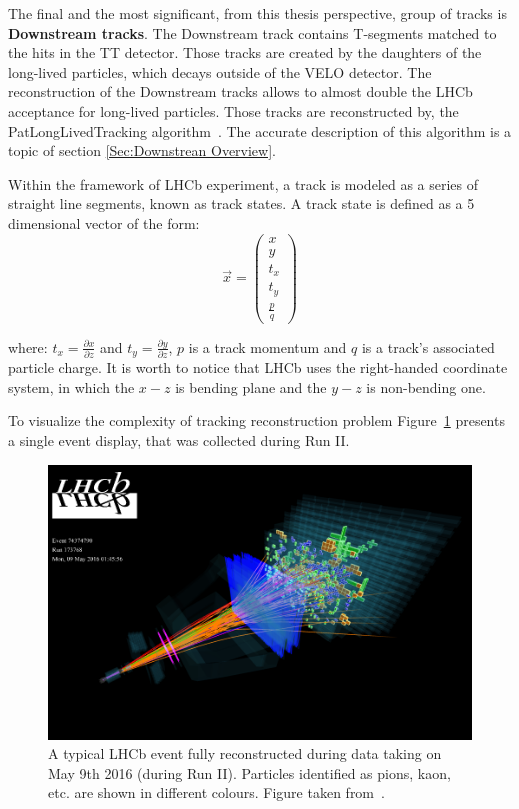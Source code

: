The final and the most significant, from this thesis perspective, group of tracks is \textbf{Downstream tracks}. The Downstream track contains T-segments matched to the hits in the TT detector. Those tracks are created by the daughters of the long-lived particles, which decays outside of the VELO detector. The reconstruction of the Downstream tracks allows to almost double the LHCb acceptance for long-lived particles. Those tracks are reconstructed by, the PatLongLivedTracking algorithm~\cite{PATLLT}. 
The accurate description of this algorithm is a topic of section \ref{Sec:Downstrean Overview}. 

Within the framework of LHCb experiment, a track is modeled as a series of straight line segments, known as track states. A track state is defined as a 5 dimensional vector of the form:
\begin{equation}
    \vec{x} = \begin{pmatrix}
    x \\ y \\ t_{x} \\ t_{y} \\ \frac{p}{q} 
    \end{pmatrix}
\end{equation}

where: $t_x = \frac{\partial x}{\partial z}$ and $t_y = \frac{\partial y}{\partial z}$, $p$ is a track momentum and $q$ is a track's associated particle charge. It is worth to notice that LHCb uses the right-handed coordinate system, in which the $x-z$ is bending plane and the $y-z$ is non-bending one. 


To visualize the complexity of tracking reconstruction problem Figure~\ref{fig:event display} presents a single event display, that was collected during Run II.   

\begin{figure}[h]
\centering
\includegraphics[scale=0.9]{figures/LHCb7_event.png}
\caption{A typical LHCb event fully reconstructed during data taking on May 9th 2016 (during Run II). Particles identified as pions, kaon, etc. are shown in different colours. Figure taken from~\cite{LHCb_event_display}.
\label{fig:event display}}
\end{figure}

